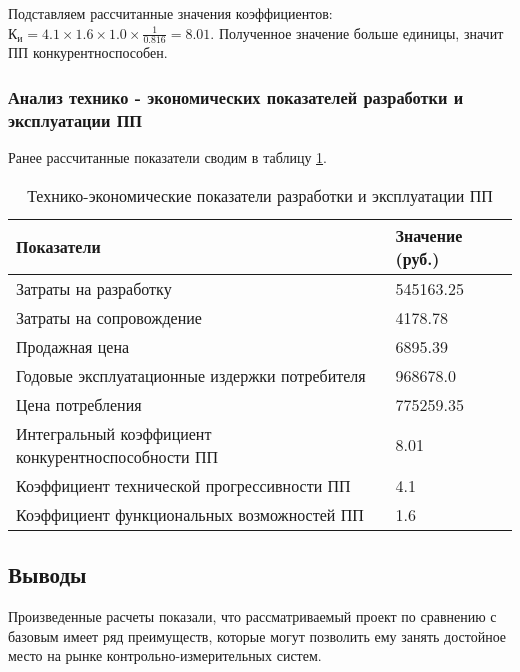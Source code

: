 Подставляем рассчитанные значения коэффициентов: $К_{и} = 4.1 \times{} 1.6 \times{} 1.0 \times{} \frac{1}{0.816} = 8.01$.
Полученное значение больше единицы, значит ПП конкурентноспособен.

\subsubsection{Анализ технико - экономических показателей разработки и эксплуатации ПП}
Ранее рассчитанные показатели сводим в таблицу \ref{table:eksplPP}.
\begin{table}[H]
\caption{Технико-экономические показатели разработки и эксплуатации  ПП}
\begin{tabular}{|p{12cm}|p{4.2cm}|}
\hline{}
Показатели & Значение (руб.) \\
\hline{}
Затраты на разработку & 545163.25 \\
\hline{}
Затраты на сопровождение & 4178.78 \\
\hline{}
Продажная цена & 6895.39 \\
\hline{}
Годовые эксплуатационные издержки потребителя & 968678.0 \\
\hline{}
Цена потребления & 775259.35 \\
\hline{}
Интегральный коэффициент   конкурентноспособности ПП & 8.01 \\
\hline{}
Коэффициент технической прогрессивности ПП & 4.1 \\
\hline{}
Коэффициент функциональных возможностей ПП & 1.6 \\
\hline
\end{tabular}
\label{table:eksplPP}
\end{table}

\subsection{Выводы}
Произведенные расчеты показали, что рассматриваемый проект по сравнению с базовым имеет ряд преимуществ,
которые могут позволить ему занять достойное место на рынке контрольно-измерительных систем.
\newpage{}
